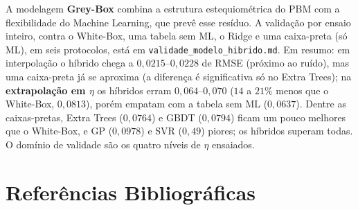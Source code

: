 \documentclass[12pt,a4paper]{article}
\begin{document}
A modelagem \textbf{Grey-Box} combina a estrutura estequiométrica do PBM com a flexibilidade do Machine Learning, que prevê esse resíduo. A validação por ensaio inteiro, contra o White-Box, uma tabela sem ML, o Ridge e uma caixa-preta (só ML), em seis protocolos, está em \texttt{validade\_modelo\_hibrido.md}. Em resumo: em interpolação o híbrido chega a $0{,}0215$--$0{,}0228$ de RMSE (próximo ao ruído), mas uma caixa-preta já se aproxima (a diferença é significativa só no Extra Trees); na \textbf{extrapolação em $\eta$} os híbridos erram $0{,}064$--$0{,}070$ ($14$ a $21\%$ menos que o White-Box, $0{,}0813$), porém empatam com a tabela sem ML ($0{,}0637$). Dentre as caixas-pretas, Extra Trees ($0{,}0764$) e GBDT ($0{,}0794$) ficam um pouco melhores que o White-Box, e GP ($0{,}0978$) e SVR ($0{,}49$) piores; os híbridos superam todas. O domínio de validade são os quatro níveis de $\eta$ ensaiados.

\section{Referências Bibliográficas}
\end{document}
